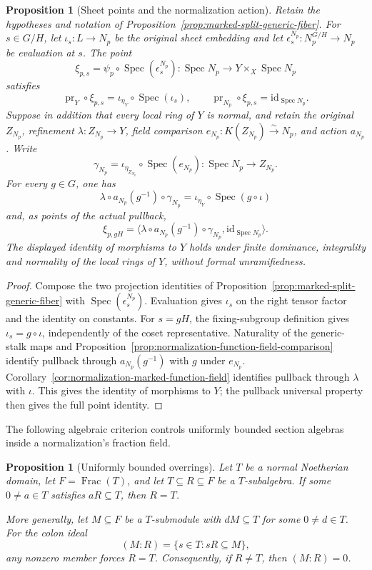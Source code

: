 \documentclass[11pt]{article}
\newtheorem{proposition}[theorem]{Proposition}
\theoremstyle{definition}
\theoremstyle{remark}
\DeclareMathOperator{\Spec}{Spec}
\DeclareMathOperator{\Frac}{Frac}
\begin{document}
\begin{proposition}[Sheet points and the normalization action]
\label{prop:split-fiber-sheet-action}
Retain the hypotheses and notation of
Proposition~\ref{prop:marked-split-generic-fiber}. For \(s\in G/H\),
let \(\iota_s:L\to N_p\) be the original sheet embedding and let
\(\epsilon_s^{N_p}:N_p^{G/H}\to N_p\) be evaluation at \(s\).
The point
\[
 \xi_{p,s}=\psi_p\circ\Spec(\epsilon_s^{N_p}):
    \Spec N_p\longrightarrow Y\times_X\Spec N_p
\]
satisfies
\[
 \operatorname{pr}_Y\circ\xi_{p,s}
   =\iota_{\eta_Y}\circ\Spec(\iota_s),\qquad
 \operatorname{pr}_{N_p}\circ\xi_{p,s}=\mathrm{id}_{\Spec N_p}.
\]
Suppose in addition that every local ring of \(Y\) is normal, and retain
the original \(Z_{N_p}\), refinement \(\lambda:Z_{N_p}\to Y\),
field comparison \(e_{N_p}:K(Z_{N_p})\xrightarrow{\sim}N_p\), and
action \(a_{N_p}\). Write
\[
 \gamma_{N_p}=\iota_{\eta_{Z_{N_p}}}\circ\Spec(e_{N_p}):
       \Spec N_p\longrightarrow Z_{N_p}.
\]
For every \(g\in G\), one has
\[
 \lambda\circ a_{N_p}(g^{-1})\circ\gamma_{N_p}
   =\iota_{\eta_Y}\circ\Spec(g\circ\iota)
\]
and, as points of the actual pullback,
\[
 \xi_{p,gH}
   =\bigl\langle\lambda\circ a_{N_p}(g^{-1})\circ\gamma_{N_p},
       \mathrm{id}_{\Spec N_p}\bigr\rangle.
\]
The displayed identity of morphisms to \(Y\) holds under finite dominance,
integrality and normality of the local rings of \(Y\), without formal
unramifiedness.
\end{proposition}

\begin{proof}
Compose the two projection identities of
Proposition~\ref{prop:marked-split-generic-fiber} with
\(\Spec(\epsilon_s^{N_p})\). Evaluation gives \(\iota_s\) on the
right tensor factor and the identity on constants. For \(s=gH\),
the fixing-subgroup definition gives \(\iota_s=g\circ\iota\),
independently of the coset representative.
Naturality of the generic-stalk maps and
Proposition~\ref{prop:normalization-function-field-comparison} identify
pullback through \(a_{N_p}(g^{-1})\) with \(g\) under \(e_{N_p}\).
Corollary~\ref{cor:normalization-marked-function-field} identifies
pullback through \(\lambda\) with \(\iota\). This gives the identity
of morphisms to \(Y\); the pullback universal property then gives the
full point identity.
\end{proof}

The following algebraic criterion controls uniformly bounded section
algebras inside a normalization's fraction field.

\begin{proposition}[Uniformly bounded overrings]
\label{prop:bounded-overring}
Let \(T\) be a normal Noetherian domain, let \(F=\Frac(T)\), and let
\(T\subseteq R\subseteq F\) be a \(T\)-subalgebra. If some
\(0\ne a\in T\) satisfies \(aR\subseteq T\), then \(R=T\).

More generally, let \(M\subseteq F\) be a \(T\)-submodule with
\(dM\subseteq T\) for some \(0\ne d\in T\). For the colon ideal
\[
  (M:R)=\{s\in T:sR\subseteq M\},
\]
any nonzero member forces \(R=T\). Consequently, if \(R\ne T\),
then \((M:R)=0\).
\end{proposition}
\end{document}
